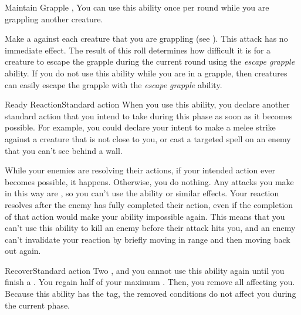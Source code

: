   \begin{activeability}{Maintain Grapple}{}
    \abilitytags {}, 
    \rankline
    You can use this ability once per round while you are grappling another creature.

    Make a  against each creature that you are grappling (see ).
    This attack has no immediate effect.
    The result of this roll determines how difficult it is for a creature to escape the grapple during the current round using the \textit{escape grapple} ability.
    If you do not use this ability while you are in a grapple, then creatures can easily escape the grapple with the \textit{escape grapple} ability.
  \end{activeability}

  \begin{activeability}{Ready Reaction}{Standard action}
    \abilitytags \atSwift
    \rankline
    When you use this ability, you declare another standard action that you intend to take during this phase as soon as it becomes possible.
    For example, you could declare your intent to make a melee strike against a creature that is not close to you, or cast a targeted spell on an enemy that you can't see behind a wall.

    While your enemies are resolving their actions, if your intended action ever becomes possible, it happens.
    Otherwise, you do nothing.
    Any attacks you make in this way are , so you can't use the  ability or similar effects.
    Your reaction resolves after the enemy has fully completed their action, even if the completion of that action would make your ability impossible again.
    This means that you can't use this ability to kill an enemy before their attack hits you, and an enemy can't invalidate your reaction by briefly moving in range and then moving back out again.
  \end{activeability}

  \begin{activeability}{Recover}{Standard action}
    \abilitytags {}
    \abilitycost Two , and you cannot use this ability again until you finish a .
    \rankline
    You regain half of your maximum .
    Then, you remove all  affecting you.
    Because this ability has the  tag, the removed conditions do not affect you during the current phase.
  \end{activeability}

